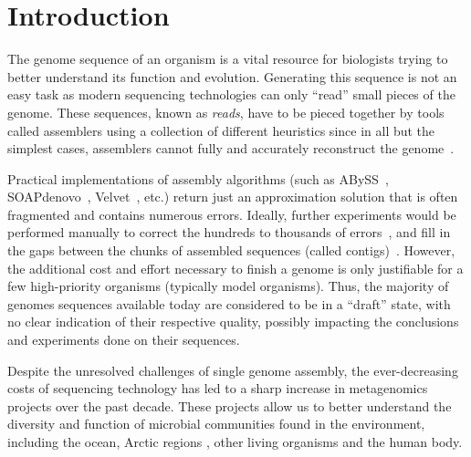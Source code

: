 \documentclass[conference]{IEEEtran}
\begin{document}




%
\IEEEpeerreviewmaketitle



\section{Introduction}
The genome sequence of an organism is a vital resource for biologists trying to better understand its function and evolution.
Generating this sequence is not an easy task as modern sequencing technologies can only ``read'' small pieces of the genome.
These sequences, known as \emph{reads}, have to be pieced together by tools called assemblers using a collection of different heuristics since in all but the simplest cases, assemblers cannot fully and accurately reconstruct the genome~\cite{myers1995,medvedev2007computability}.

Practical implementations of assembly algorithms (such as ABySS~\cite{ABySS}, SOAPdenovo~\cite{SOAPdenovo}, Velvet~\cite{Velvet}, etc.) return just an approximation solution that is often fragmented and contains numerous errors.
Ideally, further experiments would be performed manually to correct the hundreds to thousands of errors~\cite{salzberg2005misassemblies}, and fill in the gaps between the chunks of assembled sequences (called contigs)~\cite{nagarajan2010finishing}.
However, the additional cost and effort necessary to finish a genome is only justifiable for a few high-priority organisms (typically model organisms).
Thus, the majority of genomes sequences available today are considered to be in a ``draft'' state, with no clear indication of their respective quality, possibly impacting the conclusions and experiments done on their sequences.

Despite the unresolved challenges of single genome assembly, the ever-decreasing costs of sequencing technology has led to a sharp increase in metagenomics projects over the past decade.
These projects allow us to better understand the diversity and function of microbial communities found in the environment, including the ocean\cite{rusch2007sorcerer,wu2011stalking,yooseph2007sorcerer}, Arctic regions \cite{varin2012metagenomic}, other living organisms\cite{he2013comparative} and the human body\cite{gill2006metagenomic,peterson2009nih}.
\end{document}
